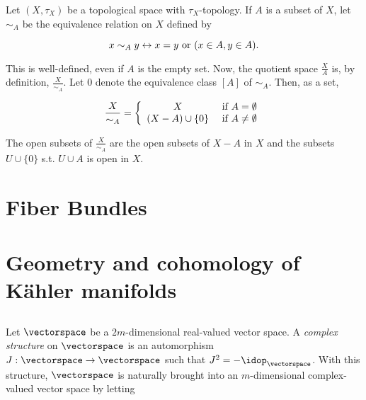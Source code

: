 \documentclass{homework}
\begin{document}
\begin{df}

Let $(X, \tau_X)$ be a topological space with $\tau_X$-topology. If $A$ is a subset of $X$, let $\sim_A$ be the equivalence relation on $X$ defined by 

$$
    x \sim_A y \leftrightarrow x=y \textnormal{ or } (x \in A, y \in A).
$$

This is well-defined, even if $A$ is the empty set. Now, the quotient space $\frac{X}{A}$ is, by definition, $\frac{X}{\sim_A}$. Let $0$ denote the equivalence class $[A]$ of $\sim_A$. Then, as a set,

\begin{equation*}
    \frac{X}{\sim_A} = \left\{
         \begin{array}{cc}
              X & \textnormal{ if } A = \emptyset \\
              (X-A) \cup \{0\} & \textnormal{ if } A \neq \emptyset
         \end{array}
    \right.
\end{equation*}

\end{df}

The open subsets of $\frac{X}{\sim_A}$ are the open subsets of $X-A$ in $X$ and the subsets $U \cup \{0\}$ s.t. $U \cup A$ is open in $X$.

\clearpage

\section{Fiber Bundles}

\clearpage

\section{Geometry and cohomology of K\"ahler manifolds}

\subsection{}

Let $\vectorspace$ be a $2m$-dimensional real-valued vector space. A \textit{complex structure} on $\vectorspace$ is an automorphism $J : \vectorspace \rightarrow \vectorspace$ such that $J^2 = - \idop_\vectorspace$. With this structure, $\vectorspace$ is naturally brought into an $m$-dimensional complex-valued vector space by letting 
\end{document}
